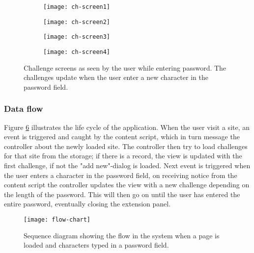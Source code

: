 \begin{figure}
    \centering
    \begin{subfigure}[t]{0.45\textwidth}
        \centering
        \texttt{[image: ch-screen1]} 
        \caption{}
        \label{challenge-screen1}
    \end{subfigure}
    \hfill
    \begin{subfigure}[t]{0.45\textwidth}
        \centering
        \texttt{[image: ch-screen2]} 
        \caption{}
        \label{challenge-screen2}
    \end{subfigure}
    \hfill
    \begin{subfigure}[t]{0.45\textwidth}
        \centering
        \texttt{[image: ch-screen3]} 
        \caption{}
        \label{challenge-screen2}
    \end{subfigure}
    \hfill
    \begin{subfigure}[t]{0.45\textwidth}
        \centering
        \texttt{[image: ch-screen4]} 
        \caption{}
        \label{challenge-screen2}
    \end{subfigure}
    \caption{Challenge screens as seen by the user while entering password. The challenges update when the user enter a new character in the password field.}
    \label{ch-screens}
\end{figure}


\newpage

\subsubsection{Data flow}\label{data-flow}
Figure \ref{flow-chart} illustrates the life cycle of the application. When the user visit a site, an event is triggered and caught by the content script, which in turn message the controller about the newly loaded site. The controller then try to load challenges for that site from the storage; if there is a record, the view is updated with the first challenge, if not the "add new"-dialog is loaded. Next event is triggered when the user enters a character in the password field, on receiving notice from the content script the controller updates the view with a new challenge depending on the length of the password. This will then go on until the user has entered the entire password, eventually closing the extension panel.
\begin{figure}
    \centering
    \texttt{[image: flow-chart]} 
    \caption{Sequence diagram showing the flow in the system when a page is loaded and characters typed in a password field.}
    \label{flow-chart}
\end{figure}

